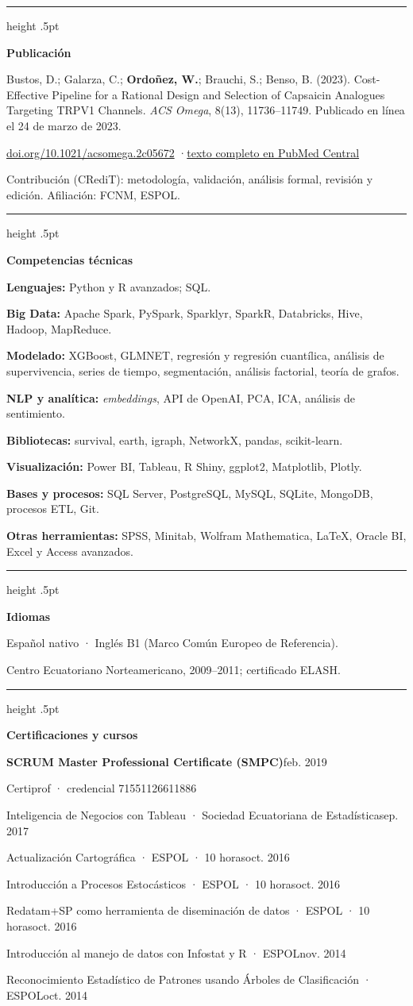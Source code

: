 \documentclass[10pt]{article}
\newcommand{\meta}{\fontsize{8.75}{12}\selectfont}
\newcommand{\sectsize}{\fontsize{12.6}{15}\selectfont}
\newcommand{\cvsection}[1]{\par\needspace{4\baselineskip}\vspace{17.5pt}%
  {\color{hair}\hrule height .5pt}\vspace{7pt}%
  {\sffamily\bfseries\sectsize\color{ink}#1\par}\vspace{5pt}}
\newcommand{\entry}[3]{\par\needspace{3\baselineskip}%
  {\sffamily\bfseries #1}\hfill{\datafont\meta\color{muted}#2}\par
  \ifx\relax#3\relax\else{\sffamily\meta\color{muted}#3\par}\fi\vspace{2pt}}
\newcommand{\role}[2]{{\sffamily #1}\hfill{\datafont\meta\color{muted}#2}\par}
\newcommand{\skill}[2]{{\sffamily\bfseries #1:} #2\par\vspace{3.5pt}}
\begin{document}
\cvsection{Publicación}
Bustos, D.; Galarza, C.; \textbf{Ordoñez, W.}; Brauchi, S.; Benso, B. (2023). Cost-Effective Pipeline for a Rational Design and Selection of Capsaicin Analogues Targeting TRPV1 Channels. \textit{ACS Omega}, 8(13), 11736–11749. Publicado en línea el 24 de marzo de 2023.\par\vspace{3.5pt}
\href{https://doi.org/10.1021/acsomega.2c05672}{doi.org/10.1021/acsomega.2c05672} \enspace·\enspace \href{https://pmc.ncbi.nlm.nih.gov/articles/PMC10077575/}{texto completo en PubMed Central}\par\vspace{3.5pt}
{\sffamily\meta\color{muted}Contribución (CRediT): metodología, validación, análisis formal, revisión y edición. Afiliación: FCNM, ESPOL.}

\cvsection{Competencias técnicas}
\skill{Lenguajes}{Python y R avanzados; SQL.}
\skill{Big Data}{Apache Spark, PySpark, Sparklyr, SparkR, Databricks, Hive, Hadoop, MapReduce.}
\skill{Modelado}{XGBoost, GLMNET, regresión y regresión cuantílica, análisis de supervivencia, series de tiempo, segmentación, análisis factorial, teoría de grafos.}
\skill{NLP y analítica}{\textit{embeddings}, API de OpenAI, PCA, ICA, análisis de sentimiento.}
\skill{Bibliotecas}{survival, earth, igraph, NetworkX, pandas, scikit-learn.}
\skill{Visualización}{Power BI, Tableau, R Shiny, ggplot2, Matplotlib, Plotly.}
\skill{Bases y procesos}{SQL Server, PostgreSQL, MySQL, SQLite, MongoDB, procesos ETL, Git.}
\skill{Otras herramientas}{SPSS, Minitab, Wolfram Mathematica, \LaTeX, Oracle BI, Excel y Access avanzados.}

\cvsection{Idiomas}
Español nativo · Inglés B1 (Marco Común Europeo de Referencia).\par\vspace{3.5pt}
{\sffamily\meta\color{muted}Centro Ecuatoriano Norteamericano, 2009–2011; certificado ELASH.}

\cvsection{Certificaciones y cursos}
\entry{SCRUM Master Professional Certificate (SMPC)}{feb. 2019}{Certiprof · credencial 71551126611886}
\par\vspace{5pt}
\role{Inteligencia de Negocios con Tableau {\meta\color{muted}· Sociedad Ecuatoriana de Estadística}}{sep. 2017}\vspace{2pt}
\role{Actualización Cartográfica {\meta\color{muted}· ESPOL · 10 horas}}{oct. 2016}\vspace{2pt}
\role{Introducción a Procesos Estocásticos {\meta\color{muted}· ESPOL · 10 horas}}{oct. 2016}\vspace{2pt}
\role{Redatam+SP como herramienta de diseminación de datos {\meta\color{muted}· ESPOL · 10 horas}}{oct. 2016}\vspace{2pt}
\role{Introducción al manejo de datos con Infostat y R {\meta\color{muted}· ESPOL}}{nov. 2014}\vspace{2pt}
\role{Reconocimiento Estadístico de Patrones usando Árboles de Clasificación {\meta\color{muted}· ESPOL}}{oct. 2014}\vspace{2pt}
\end{document}
